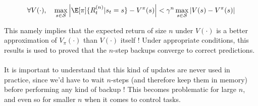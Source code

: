 \documentclass[a4paper]{article}
\begin{document}
{		
		{
			\begin{equation}
				\forall V(\cdot), \quad \max_{s\in\mathcal{S}}\left\vert \E[\pi]{R_t^{(n)}\vert s_t =s }- V^\pi(s)\right\vert < \gamma^n \max_{s\in\mathcal{S}} \left\vert V(s) -V^\pi(s)\right\vert 
				\label{eq::err_red}
			\end{equation}
		}
		\vspace{5pt}
		
		\noindent This namely implies that the expected return of size $n$ under $V(\cdot)$ is a better approximation of $V_\pi(\cdot)$ than $V(\cdot)$ itself ! Under appropriate conditions, this results is used to proved that the $n$-step backups converge to correct predictions. 
		
		\paragraph{} It is important to understand that this kind of updates are never used in practice, since we'd have to wait $n$-steps (and therefore keep them in memory) before performing any kind of backup ! This becomes problematic for large $n$, and even so for smaller $n$ when it comes to control tasks. 
	}	
\end{document}
